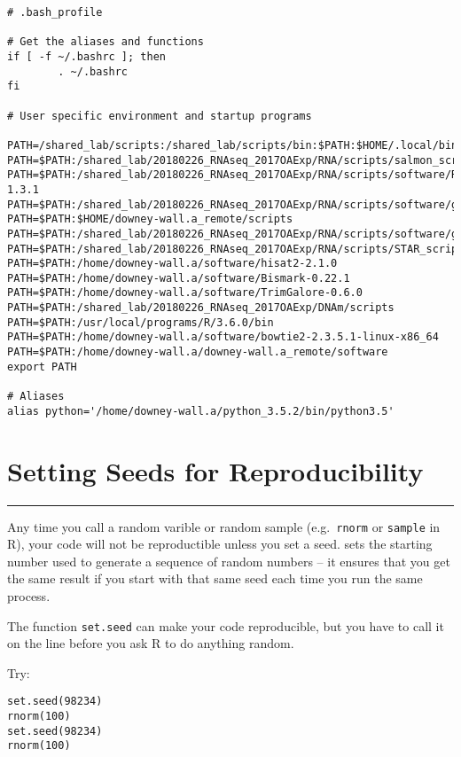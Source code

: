 \documentclass[
  letterpaper,
  DIV=11,
  numbers=noendperiod]{scrreprt}
\begin{document}
\begin{verbatim}
# .bash_profile

# Get the aliases and functions
if [ -f ~/.bashrc ]; then
        . ~/.bashrc
fi

# User specific environment and startup programs

PATH=/shared_lab/scripts:/shared_lab/scripts/bin:$PATH:$HOME/.local/bin
PATH=$PATH:/shared_lab/20180226_RNAseq_2017OAExp/RNA/scripts/salmon_scripts/
PATH=$PATH:/shared_lab/20180226_RNAseq_2017OAExp/RNA/scripts/software/RSEM/RSEM-1.3.1
PATH=$PATH:/shared_lab/20180226_RNAseq_2017OAExp/RNA/scripts/software/gffread
PATH=$PATH:$HOME/downey-wall.a_remote/scripts
PATH=$PATH:/shared_lab/20180226_RNAseq_2017OAExp/RNA/scripts/software/gffcompare
PATH=$PATH:/shared_lab/20180226_RNAseq_2017OAExp/RNA/scripts/STAR_scripts
PATH=$PATH:/home/downey-wall.a/software/hisat2-2.1.0
PATH=$PATH:/home/downey-wall.a/software/Bismark-0.22.1
PATH=$PATH:/home/downey-wall.a/software/TrimGalore-0.6.0
PATH=$PATH:/shared_lab/20180226_RNAseq_2017OAExp/DNAm/scripts
PATH=$PATH:/usr/local/programs/R/3.6.0/bin
PATH=$PATH:/home/downey-wall.a/software/bowtie2-2.3.5.1-linux-x86_64
PATH=$PATH:/home/downey-wall.a/downey-wall.a_remote/software
export PATH

# Aliases
alias python='/home/downey-wall.a/python_3.5.2/bin/python3.5'
\end{verbatim}

\hypertarget{setting-seeds-for-reproducibility}{%
\chapter{Setting Seeds for
Reproducibility}\label{setting-seeds-for-reproducibility}}

\begin{center}\rule{0.5\linewidth}{0.5pt}\end{center}

Any time you call a random varible or random sample (e.g.~\texttt{rnorm}
or \texttt{sample} in R), your code will not be reproductible unless you
set a seed. sets the starting number used to generate a sequence of
random numbers -- it ensures that you get the same result if you start
with that same seed each time you run the same process.

The function \texttt{set.seed} can make your code reproducible, but you
have to call it on the line before you ask R to do anything random.

Try:

\begin{verbatim}
set.seed(98234)
rnorm(100)
set.seed(98234)
rnorm(100)
\end{verbatim}
\end{document}
